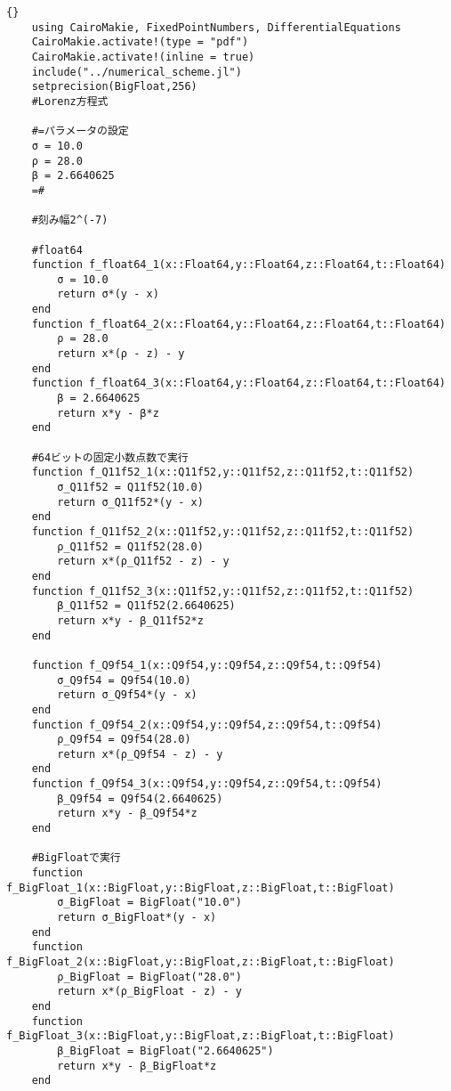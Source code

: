 \begin{lstlisting}[caption=\text{Lorenz\_example},label=code_lorenz]{}
    using CairoMakie, FixedPointNumbers, DifferentialEquations
    CairoMakie.activate!(type = "pdf")
    CairoMakie.activate!(inline = true)
    include("../numerical_scheme.jl")
    setprecision(BigFloat,256)
    #Lorenz方程式

    #=パラメータの設定
    σ = 10.0
    ρ = 28.0
    β = 2.6640625
    =#

    #刻み幅2^(-7)

    #float64
    function f_float64_1(x::Float64,y::Float64,z::Float64,t::Float64)
        σ = 10.0
        return σ*(y - x)
    end
    function f_float64_2(x::Float64,y::Float64,z::Float64,t::Float64)
        ρ = 28.0
        return x*(ρ - z) - y
    end
    function f_float64_3(x::Float64,y::Float64,z::Float64,t::Float64)
        β = 2.6640625
        return x*y - β*z
    end

    #64ビットの固定小数点数で実行
    function f_Q11f52_1(x::Q11f52,y::Q11f52,z::Q11f52,t::Q11f52)
        σ_Q11f52 = Q11f52(10.0)
        return σ_Q11f52*(y - x)
    end
    function f_Q11f52_2(x::Q11f52,y::Q11f52,z::Q11f52,t::Q11f52)
        ρ_Q11f52 = Q11f52(28.0)
        return x*(ρ_Q11f52 - z) - y
    end
    function f_Q11f52_3(x::Q11f52,y::Q11f52,z::Q11f52,t::Q11f52)
        β_Q11f52 = Q11f52(2.6640625)
        return x*y - β_Q11f52*z
    end

    function f_Q9f54_1(x::Q9f54,y::Q9f54,z::Q9f54,t::Q9f54)
        σ_Q9f54 = Q9f54(10.0)
        return σ_Q9f54*(y - x)    
    end
    function f_Q9f54_2(x::Q9f54,y::Q9f54,z::Q9f54,t::Q9f54)
        ρ_Q9f54 = Q9f54(28.0)
        return x*(ρ_Q9f54 - z) - y
    end
    function f_Q9f54_3(x::Q9f54,y::Q9f54,z::Q9f54,t::Q9f54)
        β_Q9f54 = Q9f54(2.6640625)
        return x*y - β_Q9f54*z
    end

    #BigFloatで実行
    function f_BigFloat_1(x::BigFloat,y::BigFloat,z::BigFloat,t::BigFloat)
        σ_BigFloat = BigFloat("10.0")
        return σ_BigFloat*(y - x)
    end
    function f_BigFloat_2(x::BigFloat,y::BigFloat,z::BigFloat,t::BigFloat)
        ρ_BigFloat = BigFloat("28.0")
        return x*(ρ_BigFloat - z) - y
    end
    function f_BigFloat_3(x::BigFloat,y::BigFloat,z::BigFloat,t::BigFloat)
        β_BigFloat = BigFloat("2.6640625")
        return x*y - β_BigFloat*z
    end


\end{lstlisting}
